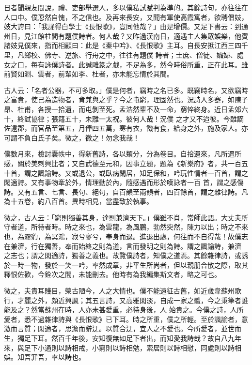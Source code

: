 \begin{pinyinscope}
 日者聞親友間說，禮、吏部舉選人，多以僕私試賦判為準的。其餘詩句，亦往往在人口中。僕恧然自愧，不之信也。及再來長安，又聞有軍使高霞寓者，欲聘倡妓，妓大誇曰：「我誦得白學士《長恨歌》，豈同他哉？」由是增價。又足下書云：到通州日，見江館柱間有題僕詩者。何人哉？又昨過漢南日，適遇主人集眾娛樂，他賓諸妓見僕來，指而相顧曰：此是《秦中吟》、《長恨歌》主耳。自長安抵江西三四千里，凡鄉校、佛寺、逆旅、行舟之中，往往有題僕
 詩者；士庶、僧徒、孀婦、處女之口，每有詠僕詩者。此誠雕篆之戲，不足為多，然今時俗所重，正在此耳。雖前賢如淵、雲者，前輩如李、杜者，亦未能忘情於其間。



 古人云：「名者公器，不可多取。」僕是何者，竊時之名已多。既竊時名，又欲竊時之富貴，使己為造物者，肯兼與之乎？今之屯窮，理固然也。況詩人多蹇，如陳子昂、杜甫，各授一拾遺，而屯剝至死。孟浩然輩不及一命，窮悴終身。近日孟郊六十，終試協律；張籍五十，未離一太祝。彼何人哉！況僕
 之才又不迨彼。今雖謫佐遠郡，而官品至第五，月俸四五萬，寒有衣，饑有食，給身之外，施及家人。亦可謂不負白氏子矣。微之，微之！勿念我哉！



 僕數月來，檢討囊帙中，得新舊詩，各以類分，分為卷目。自拾遺來，凡所遇所感，關於美刺興比者；又自武德至元和，因事立題，題為《新樂府》者，共一百五十首，謂之諷諭詩。又或退公，或臥病閑居，知足保和，吟玩性情者一百首，謂之閑適詩。又有事物牽於外，情理動於內，隨感遇而形於嘆詠者一百
 首，謂之感傷詩。又有五言、七言、長句、絕句，自百韻至兩韻者，四百餘首，謂之雜律詩。凡為十五卷，約八百首。異時相見，當盡致於執事。



 微之，古人云：「窮則獨善其身，達則兼濟天下。」僕雖不肖，常師此語。大丈夫所守者道，所待者時。時之來也，為雲龍，為風鵬，勃然突然，陳力以出；時之不來也，為霧豹，為冥鴻，寂兮寥兮，奉身而退。進退出處，何往而不自得哉！故僕志在兼濟，行在獨善，奉而始終之則為道，言而發明之則為詩。謂之諷諭詩，兼濟
 之志也；謂之閑適詩，獨善之義也。故覽僕詩者，知僕之道焉。其餘雜律詩，或誘於一時一物，發於一笑一吟，率然成章，非平生所尚者，但以親朋合散之際，取其釋恨佐歡，今銓次之間，未能刪去。他時有為我編集斯文者，略之可也。



 微之，夫貴耳賤目，榮古陋今，人之大情也。僕不能遠征古舊，如近歲韋蘇州歌行，才麗之外，頗近興諷；其五言詩，又高雅閑淡，自成一家之體，今之秉筆者誰能及之？然當蘇州在時，人亦未甚愛重，必待身後，人
 始貴之。今僕之詩，人所愛者，悉不過雜律詩與《長恨歌》已下耳。時之所重，僕之所輕。至於諷諭者，意激而言質；閑適者，思澹而辭迂。以質合迂，宜人之不愛也。今所愛者，並世而生，獨足下耳。然百千年後，安知復無如足下者出，而知愛我詩哉？故自八九年來，與足下小通則以詩相戒，小窮則以詩相勉，索居則以詩相慰，同處則以詩相娛。知吾罪吾，率以詩也。




\end{pinyinscope}
